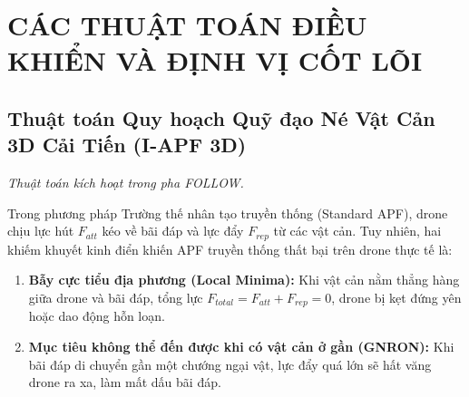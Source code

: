 \documentclass[12pt,a4paper]{article}
\begin{document}
\section{CÁC THUẬT TOÁN ĐIỀU KHIỂN VÀ ĐỊNH VỊ CỐT LÕI}

\subsection{Thuật toán Quy hoạch Quỹ đạo Né Vật Cản 3D Cải Tiến (I-APF 3D)}
\textit{Thuật toán kích hoạt trong pha FOLLOW.}

Trong phương pháp Trường thế nhân tạo truyền thống (Standard APF), drone chịu lực hút $F_{att}$ kéo về bãi đáp và lực đẩy $F_{rep}$ từ các vật cản. Tuy nhiên, hai khiếm khuyết kinh điển khiến APF truyền thống thất bại trên drone thực tế là:
\begin{enumerate}[noitemsep,topsep=2pt]
    \item \textbf{Bẫy cực tiểu địa phương (Local Minima):} Khi vật cản nằm thẳng hàng giữa drone và bãi đáp, tổng lực $F_{total} = F_{att} + F_{rep} = 0$, drone bị kẹt đứng yên hoặc dao động hỗn loạn.
    \item \textbf{Mục tiêu không thể đến được khi có vật cản ở gần (GNRON):} Khi bãi đáp di chuyển gần một chướng ngại vật, lực đẩy quá lớn sẽ hất văng drone ra xa, làm mất dấu bãi đáp.
\end{enumerate}
\end{document}
